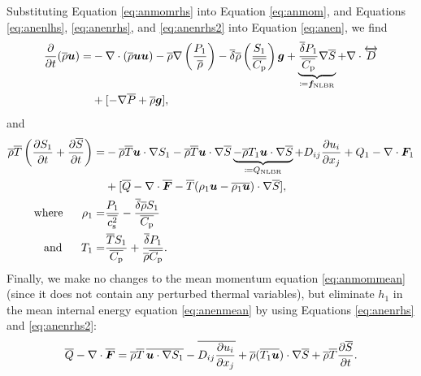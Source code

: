 \documentclass[12pt]{article}
\newcommand{\vecf}{\bm{F}}
\newcommand{\forcenlbr}{\bm{f}_{\rm NLBR}}
\begin{document}
Substituting Equation \eqref{eq:anmomrhs} into Equation \eqref{eq:anmom}, and Equations \eqref{eq:anenlhs}, \eqref{eq:anenrhs}, and \eqref{eq:anenrhs2} into Equation \eqref{eq:anen}, we find
	\begin{align}\label{eq:anmommod}
		\pderiv{}{t}(\rhoover\vecu)= &-\Div(\rhoover\vecu\vecu) -\rhoover\nabla\left(\frac{\prsone}{\rhoover}\right) - \deltaover \rhoover \left(\frac{\entrone}{\cpover}\right) \vecg + \underbrace{\frac{\deltaover \prsone}{\cpover} \nabla\entrover}_{\define \forcenlbr}+\Div \overleftrightarrow{D}\nonumber\\
		&+[-\nabla\prsover + \rhoover\vecg],
	\end{align}
and
\begin{subequations}\label{eq:anenmod}
\begin{align}
	\rhoover\tmpover\left(\pderiv{\entrone}{t}+\pderiv{\entrover}{t}\right)= &-\rhoover\tmpover\ugrad \entrone - \rhoover \tmpover \ugrad \entrover \underbrace{- \rhoover \tmpone\ugrad\entrover}_{\define Q_{\rm NLBR}}+D_{ij}\pderiv{u_i}{x_j} + Q _1- \Div\vecf_1  \nonumber\\
	& +[\heatover - \Div\overline{\vecf} - \tmpover(\rhoone\vecu-\overline{\rhoone\vecu})\cdot\nabla\entrover],\label{eq:anenmodmain}\\
	\where \rhoone =& \frac{\prsone}{\cssqover}-\frac{\deltaover\rhoover \entrone}{\cpover}\label{eq:anenmodrhoone}\\
	\andd \tmpone = & \frac{\tmpover \entrone}{\cpover} + \frac{\deltaover \prsone}{\rhoover\cpover}.\label{eq:anenmodtmpone}
\end{align}
\end{subequations}
Finally, we make no changes to the mean momentum equation \eqref{eq:anmommean} (since it does not contain any perturbed thermal variables), but eliminate $h_1$ in the mean internal energy equation \eqref{eq:anenmean} by using Equations \eqref{eq:anenrhs} and \eqref{eq:anenrhs2}:
\begin{align}\label{eq:anenmean2}
	\heatover-\Div\overline{\vecf} = \rhoover\tmpover\, \overline{\ugrad \entrone}-\overline{D_{ij}\pderiv{u_i}{x_j}} + \rhoover (\overline{\tmpone\vecu})\dotgrad\entrover + \rhoover\tmpover\pderiv{\entrover}{t}.
\end{align}
\end{document}
